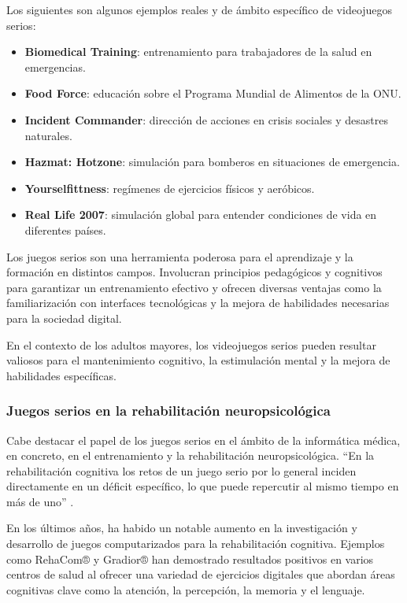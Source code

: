 Los siguientes son algunos ejemplos reales y de ámbito específico de videojuegos serios:
\begin{itemize}[leftmargin=1.5cm, topsep=2.2pt, itemsep=1pt]
    \item \textbf{Biomedical Training}: entrenamiento para trabajadores de la salud en emergencias.
    \item \textbf{Food Force}: educación sobre el Programa Mundial de Alimentos de la ONU.
    \item \textbf{Incident Commander}: dirección de acciones en crisis sociales y desastres naturales.
    \item \textbf{Hazmat: Hotzone}: simulación para bomberos en situaciones de emergencia.
    \item \textbf{Yourselfittness}: regímenes de ejercicios físicos y aeróbicos.
    \item \textbf{Real Life 2007}: simulación global para entender condiciones de vida en diferentes países.
\end{itemize}

Los juegos serios son una herramienta poderosa para el aprendizaje y la formación en distintos campos. Involucran principios pedagógicos y cognitivos para garantizar un entrenamiento efectivo y ofrecen diversas ventajas como la familiarización con interfaces tecnológicas y la mejora de habilidades necesarias para la sociedad digital.

En el contexto de los adultos mayores, los videojuegos serios pueden resultar valiosos para el mantenimiento cognitivo, la estimulación mental y la mejora de habilidades específicas.

\newpage
\subsubsection{Juegos serios en la rehabilitación neuropsicológica}

Cabe destacar el papel de los juegos serios en el ámbito de la informática médica, en concreto, en el entrenamiento y la rehabilitación neuropsicológica. \enquote{En la rehabilitación cognitiva los retos de un juego serio por lo general inciden directamente en un déficit específico, lo que puede repercutir al mismo tiempo en más de uno} \parencite{juegosSerios2}.

En los últimos años, ha habido un notable aumento en la investigación y desarrollo de juegos computarizados para la rehabilitación cognitiva. Ejemplos como RehaCom® y Gradior® \parencite{ICTestudios} han demostrado resultados positivos en varios centros de salud al ofrecer una variedad de ejercicios digitales que abordan áreas cognitivas clave como la atención, la percepción, la memoria y el lenguaje.

